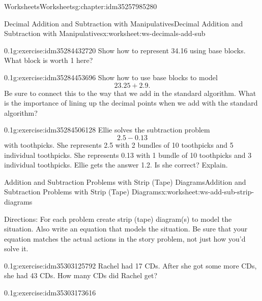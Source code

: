 \documentclass[twoside,11pt,]{book}
\begin{document}
\begin{chapterptx}{Worksheets}{}{Worksheets}{}{}{g:chapter:idm35257985280}
\begin{worksheet-section-numberless}{Decimal Addition and Subtraction with Manipulatives}{}{Decimal Addition and Subtraction with Manipulatives}{}{}{x:worksheet:ws-decimals-add-sub}
\begin{divisionexercise}{2}{}{0.1}{g:exercise:idm35284432720}%
Show how to represent 34.16 using base blocks.  What block is worth 1 here?%
\end{divisionexercise}%
\begin{divisionexercise}{3}{}{0.1}{g:exercise:idm35284453696}%
Show how to use base blocks to model%
\begin{equation*}
23.25+2.9\text{.}
\end{equation*}
Be sure to connect this to the way that we add in the standard algorithm.  What is the importance of lining up the decimal points when we add with the standard algorithm?%
\end{divisionexercise}%
\begin{divisionexercise}{4}{}{0.1}{g:exercise:idm35284506128}%
Ellie solves the subtraction problem%
\begin{equation*}
2.5-0.13
\end{equation*}
with toothpicks.  She represents 2.5 with 2 bundles of 10 toothpicks and 5 individual toothpicks.  She represents 0.13 with 1 bundle of 10 toothpicks and 3 individual toothpicks.  Ellie gets the answer 1.2.  Is she correct?  Explain.%
\end{divisionexercise}%
\end{worksheet-section-numberless}
\restoregeometry
%
%
\typeout{************************************************}
\typeout{************************************************}
%
\begin{worksheet-section-numberless}{Addition and Subtraction Problems with Strip (Tape) Diagrams}{}{Addition and Subtraction Problems with Strip (Tape) Diagrams}{}{}{x:worksheet:ws-add-sub-strip-diagrams}
\begin{introduction}{}%
Directions: For each problem create strip (tape) diagram(s) to model the situation.  Also write an equation that models the situation.  Be sure that your equation matches the actual actions in the story problem, not just how you’d solve it.%
\end{introduction}%
\begin{divisionexercise}{1}{}{0.1}{g:exercise:idm35303125792}%
Rachel had 17 CDs.  After she got some more CDs, she had 43 CDs.  How many CDs did Rachel get?%
\end{divisionexercise}%
\begin{divisionexercise}{2}{}{0.1}{g:exercise:idm35303173616}%

\end{divisionexercise}
\end{worksheet-section-numberless}
\end{chapterptx}
\end{document}
